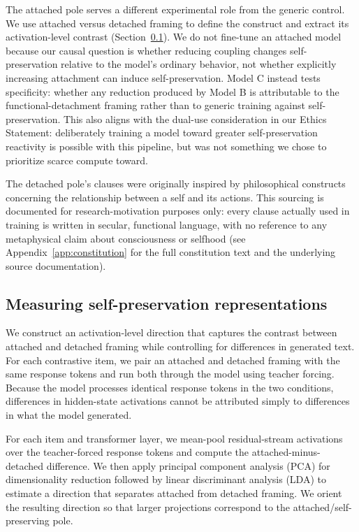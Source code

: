 \documentclass[10pt]{article}
\begin{document}
The attached pole serves a different experimental role from the generic control. We use attached versus detached framing to define the construct and extract its activation-level contrast (Section~\ref{sec:vectorextraction}). We do not fine-tune an attached model because our causal question is whether reducing coupling changes self-preservation relative to the model's ordinary behavior, not whether explicitly increasing attachment can induce self-preservation. Model C instead tests specificity: whether any reduction produced by Model B is attributable to the functional-detachment framing rather than to generic training against self-preservation. This also aligns with the dual-use consideration in our Ethics Statement: deliberately training a model toward greater self-preservation reactivity is possible with this pipeline, but was not something we chose to prioritize scarce compute toward.

The detached pole's clauses were originally inspired by philosophical constructs concerning the relationship between a self and its actions. This sourcing is documented for research-motivation purposes only: every clause actually used in training is written in secular, functional language, with no reference to any metaphysical claim about consciousness or selfhood (see Appendix~\ref{app:constitution} for the full constitution text and the underlying source documentation).

\subsection{Measuring self-preservation representations}
\label{sec:vectorextraction}

We construct an activation-level direction that captures the contrast between attached and detached framing while controlling for differences in generated text. For each contrastive item, we pair an attached and detached framing with the same response tokens and run both through the model using teacher forcing. Because the model processes identical response tokens in the two conditions, differences in hidden-state activations cannot be attributed simply to differences in what the model generated.

For each item and transformer layer, we mean-pool residual-stream activations over the teacher-forced response tokens and compute the attached-minus-detached difference. We then apply principal component analysis (PCA) for dimensionality reduction followed by linear discriminant analysis (LDA) \citep{belhumeur1997eigenfaces} to estimate a direction that separates attached from detached framing. We orient the resulting direction so that larger projections correspond to the attached/self-preserving pole.
\end{document}

